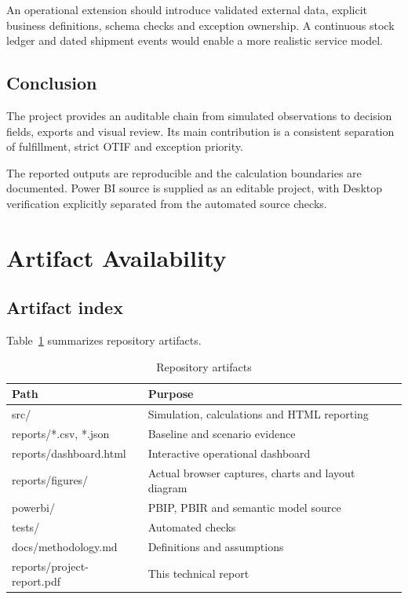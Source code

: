 \documentclass[conference,letterpaper]{IEEEtran}
\begin{document}
An operational extension should introduce validated external data, explicit business definitions, schema checks and exception ownership. A continuous stock ledger and dated shipment events would enable a more realistic service model.


\subsection{Conclusion}

The project provides an auditable chain from simulated observations to decision fields, exports and visual review. Its main contribution is a consistent separation of fulfillment, strict OTIF and exception priority.


The reported outputs are reproducible and the calculation boundaries are documented. Power BI source is supplied as an editable project, with Desktop verification explicitly separated from the automated source checks.


\section{Artifact Availability}

\subsection{Artifact index}

Table~\ref{tab:7} summarizes repository artifacts.

\begin{table}[H]
\caption{Repository artifacts}\label{tab:7}
\centering\footnotesize
\setlength{\tabcolsep}{3pt}
\begin{tabularx}{\columnwidth}{>{\raggedright\arraybackslash}X >{\raggedright\arraybackslash}X}
\hline
\textbf{Path} & \textbf{Purpose} \\
\hline
src/ & Simulation, calculations and HTML reporting \\
reports/*.csv, *.json & Baseline and scenario evidence \\
reports/dashboard.html & Interactive operational dashboard \\
reports/figures/ & Actual browser captures, charts and layout diagram \\
powerbi/ & PBIP, PBIR and semantic model source \\
tests/ & Automated checks \\
docs/methodology.md & Definitions and assumptions \\
reports/project-report.pdf & This technical report \\
\hline
\end{tabularx}
\end{table}
\end{document}
